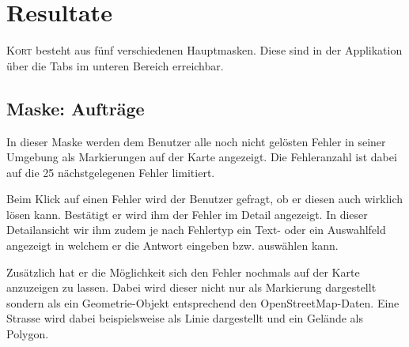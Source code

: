 \section{Resultate}

\textsc{Kort} besteht aus fünf verschiedenen Hauptmasken.
Diese sind in der Applikation über die Tabs im unteren Bereich erreichbar.

\subsection{Maske: Aufträge}
In dieser Maske werden dem Benutzer alle noch nicht gelösten Fehler in seiner Umgebung als Markierungen auf der Karte angezeigt.
Die Fehleranzahl ist dabei auf die 25 nächstgelegenen Fehler limitiert.

Beim Klick auf einen Fehler wird der Benutzer gefragt, ob er diesen auch wirklich lösen kann.
Bestätigt er wird ihm der Fehler im Detail angezeigt.
In dieser Detailansicht wir ihm zudem je nach Fehlertyp ein Text- oder ein Auswahlfeld angezeigt in welchem er die Antwort eingeben bzw. auswählen kann. 

Zusätzlich hat er die Möglichkeit sich den Fehler nochmals auf der Karte anzuzeigen zu lassen.
Dabei wird dieser nicht nur als Markierung dargestellt sondern als ein Geometrie-Objekt entsprechend den OpenStreetMap-Daten.
Eine Strasse wird dabei beispielsweise als Linie dargestellt und ein Gelände als Polygon.

